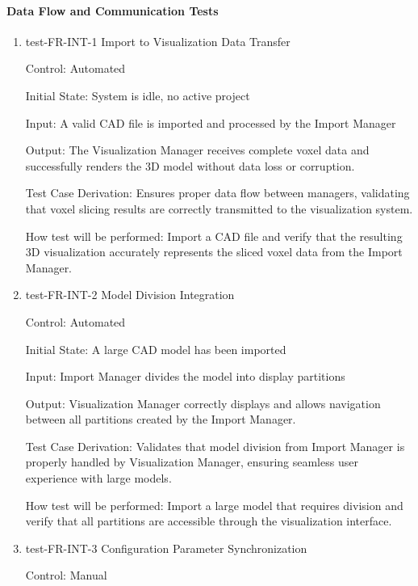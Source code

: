 \documentclass[12pt, titlepage]{article}
\begin{document}
\paragraph{Data Flow and Communication Tests}

\begin{enumerate}

\item{test-FR-INT-1 Import to Visualization Data Transfer\\}

Control: Automated
					
Initial State: System is idle, no active project
					
Input: A valid CAD file is imported and processed by the Import Manager
					
Output: The Visualization Manager receives complete voxel data and successfully renders
the 3D model without data loss or corruption.

Test Case Derivation: Ensures proper data flow between managers, validating that
voxel slicing results are correctly transmitted to the visualization system.
					
How test will be performed: Import a CAD file and verify that the resulting 3D
visualization accurately represents the sliced voxel data from the Import Manager.

\item{test-FR-INT-2 Model Division Integration\\}

Control: Automated
					
Initial State: A large CAD model has been imported
					
Input: Import Manager divides the model into display partitions
					
Output: Visualization Manager correctly displays and allows navigation between all
partitions created by the Import Manager.

Test Case Derivation: Validates that model division from Import Manager is properly
handled by Visualization Manager, ensuring seamless user experience with large models.
					
How test will be performed: Import a large model that requires division and verify
that all partitions are accessible through the visualization interface.

\item{test-FR-INT-3 Configuration Parameter Synchronization\\}

Control: Manual
					

\end{enumerate}
\end{document}
